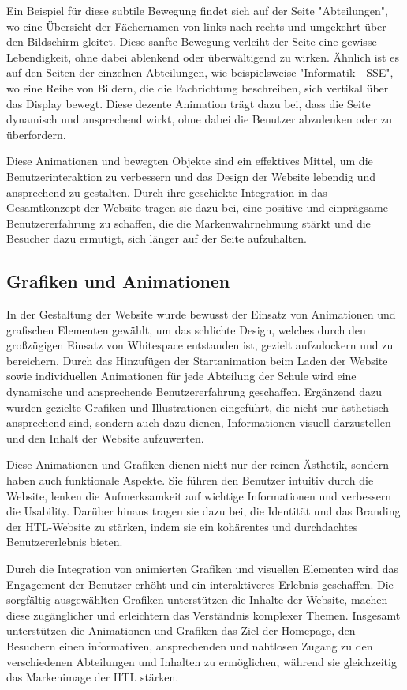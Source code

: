 Ein Beispiel für diese subtile Bewegung findet sich auf der Seite "Abteilungen", wo eine Übersicht der Fächernamen von links nach rechts 
und umgekehrt über den Bildschirm gleitet. Diese sanfte Bewegung verleiht der Seite eine gewisse Lebendigkeit, ohne dabei ablenkend oder 
überwältigend zu wirken. Ähnlich ist es auf den Seiten der einzelnen Abteilungen, wie beispielsweise "Informatik - SSE", wo eine Reihe von
 Bildern, die die Fachrichtung beschreiben, sich vertikal über das Display bewegt. Diese dezente Animation trägt dazu bei, dass die Seite dynamisch und ansprechend wirkt, ohne dabei die Benutzer abzulenken oder zu überfordern.

Diese Animationen und bewegten Objekte sind ein effektives Mittel, um die Benutzerinteraktion zu verbessern und das
 Design der Website lebendig und ansprechend zu gestalten. Durch ihre geschickte Integration in das Gesamtkonzept der Website tragen sie 
 dazu bei, eine positive und einprägsame Benutzererfahrung zu schaffen, die die Markenwahrnehmung stärkt und die Besucher dazu ermutigt, 
 sich länger auf der Seite aufzuhalten.


\subsection{Grafiken und Animationen}
In der Gestaltung der Website wurde bewusst der Einsatz von Animationen und grafischen Elementen gewählt, 
um das schlichte Design, welches durch den großzügigen Einsatz von Whitespace entstanden ist, gezielt aufzulockern und 
zu bereichern. Durch das Hinzufügen der Startanimation beim Laden der Website sowie individuellen Animationen für jede 
Abteilung der Schule wird eine dynamische und ansprechende Benutzererfahrung geschaffen. Ergänzend dazu wurden gezielte Grafiken und 
Illustrationen eingeführt, die nicht nur ästhetisch ansprechend sind, sondern auch dazu dienen, Informationen visuell 
darzustellen und den Inhalt der Website aufzuwerten.

Diese Animationen und Grafiken dienen nicht nur der reinen Ästhetik, sondern haben auch funktionale Aspekte. 
Sie führen den Benutzer intuitiv durch die Website, lenken die Aufmerksamkeit auf wichtige Informationen und verbessern die 
Usability. Darüber hinaus tragen sie dazu bei, die Identität und das Branding der HTL-Website zu stärken, indem sie ein 
kohärentes und durchdachtes Benutzererlebnis bieten.

Durch die Integration von animierten Grafiken und visuellen Elementen wird das Engagement der Benutzer erhöht und ein 
interaktiveres Erlebnis geschaffen. Die sorgfältig ausgewählten Grafiken unterstützen die Inhalte der Website, machen diese 
zugänglicher und erleichtern das Verständnis komplexer Themen. Insgesamt unterstützen die Animationen und Grafiken das Ziel der Homepage, 
den Besuchern einen informativen, ansprechenden und nahtlosen Zugang zu den verschiedenen Abteilungen und Inhalten zu ermöglichen, 
während sie gleichzeitig das Markenimage der HTL stärken.

